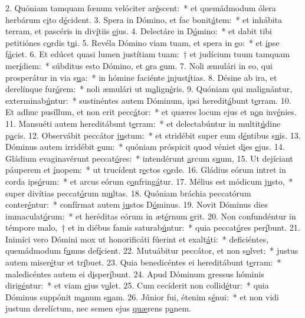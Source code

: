 2. Quóniam tamquam fœnum velóciter ar\uline{é}scent:~* et quemádmodum ólera herbárum c\uline{i}to d\uline{é}cident.
3. Spera in Dómino, et fac bonit\uline{á}tem:~* et inhábita terram, et pascéris in div\uline{í}tiis \uline{e}jus.
4. Delectáre in D\uline{ó}mino:~* et dabit tibi petitiónes c\uline{o}rdis t\uline{u}i.
5. Revéla Dómino viam tuam, et spera in \uline{e}o:~* et \uline{i}pse f\uline{á}ciet.
6. Et edúcet quasi lumen justítiam tuam:~† et judícium tuum tamquam mer\uline{í}diem:~* súbditus esto Dómino, et \uline{o}ra \uline{e}um.
7. Noli æmulári in eo, qui prosperátur in via s\uline{u}a:~* in hómine faciénte \uline{i}njust\uline{í}tias.
8. Désine ab ira, et derelínque fur\uline{ó}rem:~* noli æmulári ut m\uline{a}lign\uline{é}ris.
9. Quóniam qui malignántur, exterminab\uline{ú}ntur:~* sustinéntes autem Dóminum, ipsi heredit\uline{á}bunt t\uline{e}rram.
10. Et adhuc pusíllum, et non erit pecc\uline{á}tor:~* et quæres locum ejus et n\uline{o}n inv\uline{é}nies.
11. Mansuéti autem hereditábunt t\uline{e}rram:~* et delectabúntur in multit\uline{ú}dine p\uline{a}cis.
12. Observábit peccátor j\uline{u}stum:~* et stridébit super eum d\uline{é}ntibus s\uline{u}is.
13. Dóminus autem irridébit \uline{e}um:~* quóniam próspicit quod véniet d\uline{i}es \uline{e}jus.
14. Gládium evaginavérunt peccat\uline{ó}res:~* intendérunt \uline{a}rcum s\uline{u}um,
15. Ut dejíciant páuperem et \uline{í}nopem:~* ut trucídent r\uline{e}ctos c\uline{o}rde.
16. Gládius eórum intret in corda ips\uline{ó}rum:~* et arcus eórum c\uline{o}nfring\uline{á}tur.
17. Mélius est módicum j\uline{u}sto,~* super divítias peccat\uline{ó}rum m\uline{u}ltas.
18. Quóniam bráchia peccatórum conter\uline{é}ntur:~* confírmat autem j\uline{u}stos D\uline{ó}minus.
19. Novit Dóminus dies immaculat\uline{ó}rum:~* et heréditas eórum in æt\uline{é}rnum \uline{e}rit.
20. Non confundéntur in témpore malo,~† et in diébus famis saturab\uline{ú}ntur:~* quia peccat\uline{ó}res per\uline{í}bunt.
21. Inimíci vero Dómini mox ut honorificáti fúerint et exalt\uline{á}ti:~* deficiéntes, quemádmodum f\uline{u}mus def\uline{í}cient.
22. Mutuábitur peccátor, et non s\uline{o}lvet:~* justus autem miser\uline{é}tur et tr\uline{í}buet.
23. Quia benedicéntes ei hereditábunt t\uline{e}rram:~* maledicéntes autem ei d\uline{i}sper\uline{í}bunt.
24. Apud Dóminum gressus hóminis dirig\uline{é}ntur:~* et viam \uline{e}jus v\uline{o}let.
25. Cum cecíderit non collid\uline{é}tur:~* quia Dóminus suppónit m\uline{a}num s\uline{u}am.
26. Júnior fui, étenim s\uline{é}nui:~* et non vidi justum derelíctum, nec semen ejus \uline{quæ}rens p\uline{a}nem.
